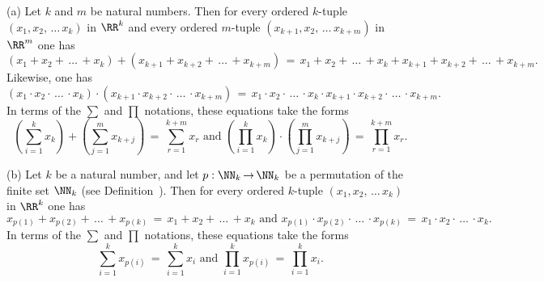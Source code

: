 \hspace*{\parindent} (a) Let $k$ and $m$ be natural numbers. Then for every ordered $k$-tuple $(x_{1}, x_{2},\,{\ldots}\,x_{k})$ in ${\RR}^{k}$
    and every ordered $m$-tuple $(x_{k+1}, x_{2},\,{\ldots}\,x_{k+m})$ in ${\RR}^{m}$ one has
        \begin{displaymath}
        \left(x_{1}+x_{2}+\,{\ldots}\,+x_{k}\right)
    +
         \left(x_{k+1}+x_{k+2}+\,{\ldots}\,+x_{k+m}\right)
     \,=\, 
        x_{1}+x_{2}+\,{\ldots}\,+x_{k} + x_{k+1}+x_{k+2}+\,{\ldots}\,+x_{k+m}.
        \end{displaymath}
    Likewise, one has
        \begin{displaymath}
        \left(x_{1}{\cdot}x_{2}{\cdot}\,{\ldots}\,{\cdot}x_{k}\right)
    {\cdot}
         \left(x_{k+1}{\cdot}x_{k+2}{\cdot}\,{\ldots}\,{\cdot}x_{k+m}\right)
     \,=\, 
        x_{1}{\cdot}x_{2}{\cdot}\,{\ldots}\,{\cdot}x_{k} {\cdot} x_{k+1}{\cdot}x_{k+2}{\cdot}\,{\ldots}\,{\cdot}x_{k+m}.
        \end{displaymath}
    In terms of the $\sum$ and $\prod$ notations, these equations take the forms
        \begin{displaymath}
        \left(\sum_{i=1}^{k} x_{k}\right) + \left(\sum_{j=1}^{m} x_{k+j}\right)
     \,=\, 
        \sum_{r=1}^{k+m} x_{r}
        \mbox{ and }
        \left(\prod_{i=1}^{k} x_{k}\right) {\cdot} \left(\prod_{j=1}^{m} x_{k+j}\right)
     \,=\, 
        \prod_{r=1}^{k+m} x_{r}.
        \end{displaymath}

\V

         (b) Let $k$ be a natural number, and let $p:{\NN}_{k} \,{\rightarrow}\, {\NN}_{k}$ be a permutation of the finite set ${\NN}_{k}$
    (see Definition~). Then for every ordered $k$-tuple $(x_{1}, x_{2},\,{\ldots}\,x_{k})$ in ${\RR}^{k}$ one has
        \begin{displaymath}
        x_{p(1)}+x_{p(2)}+\,{\ldots}\,+x_{p(k)} \,=\, 
        x_{1}+x_{2}+\,{\ldots}\,+x_{k}
    \mbox{ and }
        x_{p(1)}{\cdot}x_{p(2)}{\cdot}\,{\ldots}\,{\cdot}x_{p(k)} \,=\, 
        x_{1}{\cdot}x_{2}{\cdot}\,{\ldots}\,{\cdot}x_{k}.
        \end{displaymath}
    In terms of the $\sum$ and $\prod$ notations, these equations take the forms
        \begin{displaymath}
        \sum_{i=1}^{k} x_{p(i)} \,=\, \sum_{i=1}^{k} x_{i}
    \mbox{ and }
        \prod_{i=1}^{k} x_{p(i)} \,=\, \prod_{i=1}^{k} x_{i}.
        \end{displaymath}



